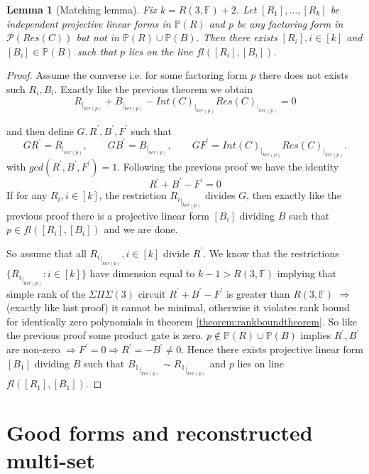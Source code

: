 \documentclass[12pt]{caltech_thesis}
\theoremstyle{plain}
\newtheorem{lemma}{Lemma}
\theoremstyle{definition}
\newcommand{\F}{\mathbb{F}}
\newcommand{\MP}{\mathcal{P}}
\newcommand{\PP}{\mathbb{P}}
\begin{document}
\begin{lemma}[Matching lemma]\label{lemma:matchinglemma}
 Fix $k = R(3,\F) +2$. Let $[R_1],\ldots,[R_k]$ be independent projective linear forms in $\PP(R)$ and $p$ be any factoring form in 
 $\MP(Res(C))$ but not in $\PP(R)\cup
 \PP(B)$. Then there
 exists $[R_i], i\in [k]$ and $[B_i]\in \PP(B)$ such that $p$ lies on the line $fl([R_i],[B_i])$.
\end{lemma}
\begin{proof}
Assume the converse i.e. for some factoring form $p$ there does not exists such $R_i,B_i$. Exactly like the previous theorem we obtain
 \[
 R_{|_{ker(p)}} + B_{|_{ker(p)}} - Int(C)_{|_{ker(p)}} Res(C)_{|_{ker(p)}} = 0
\]
 
 and then define $G,R^\prime,B^\prime,F^\prime$ such that
 \[
GR^\prime = R_{|_{ker(p)}}, \hspace{2em} GB^\prime = B_{|_{ker(p)}}, \hspace{2em} GF^\prime = Int(C)_{|_{ker(p)}}Res(C)_{|_{ker(p)}}.
\]
with $gcd(R^\prime,B^\prime,F^\prime)=1$. Following the previous proof we have the identity
\[
 R^\prime+B^\prime-F^\prime=0
\]
If for any $R_i, i\in [k]$, the restriction ${R_i}_{|_{ker(p)}}$ divides $G$, then exactly like the previous proof there is a 
  projective linear form $[B_i]$ dividing $B$ such that $p\in fl([R_i],[B_i])$ and we are done.
  
So assume that all ${R_i}_{|_{ker(p)}}, i\in [k]$ divide $R^\prime$. We know that the restrictions $\{{R_i}_{|_{ker(p)}} : i\in [k]\}$
have dimension equal to $k-1 > R(3,\F)$ implying that simple rank of the $\Sigma\Pi\Sigma(3)$ circuit 
$R^\prime+B^\prime-F^\prime $ is greater than $R(3,\F)$ $\Rightarrow$ (exactly like last proof) it cannot be minimal, 
otherwise it violates rank bound for identically zero polynomials in theorem \ref{theorem:rankboundtheorem}. So like the previous proof some
product gate is zero. $p\notin\PP(R)\cup \PP(B)$ implies $R^\prime,B^\prime$ are non-zero $\Rightarrow F^\prime=0 \Rightarrow R^\prime = -B^\prime \neq 0$.
Hence there exists projective linear form $[B_1]$ dividing $B$ such that ${B_1}_{|_{ker(p)}} \sim {R_1}_{|_{ker(p)}}$ and 
$p$ lies on line $fl([R_1],[B_1])$. 

\end{proof}

\section{ Good forms and reconstructed multi-set}\label{section:goodforms}
\end{document}
